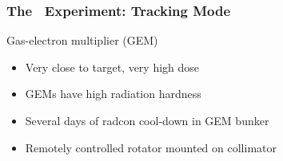 \begin{frame}
 \frametitle{The \Qweak\ Experiment: Tracking Mode}
 \begin{block}{Gas-electron multiplier (GEM)}
  \begin{itemize}
   \item Very close to target, very high dose
   \item GEMs have high radiation hardness
   \item Several days of radcon cool-down in GEM bunker
   \item Remotely controlled rotator mounted on collimator
  \end{itemize}
  \begin{center}
  \end{center}
 \end{block}
\end{frame}
